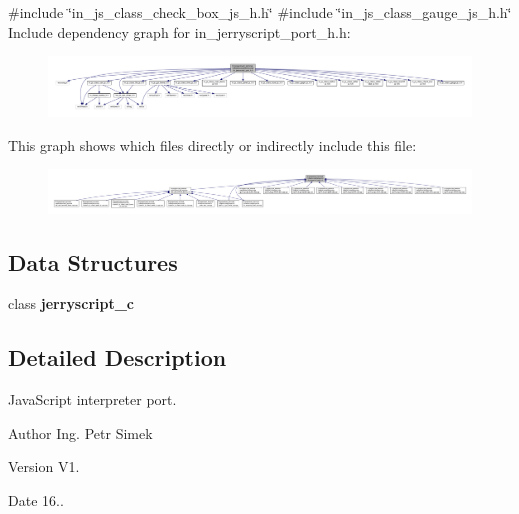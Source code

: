 {\ttfamily \#include \char`\"{}in\+\_\+js\+\_\+class\+\_\+check\+\_\+box\+\_\+js\+\_\+h.\+h\char`\"{}}\newline
{\ttfamily \#include \char`\"{}in\+\_\+js\+\_\+class\+\_\+gauge\+\_\+js\+\_\+h.\+h\char`\"{}}\newline
Include dependency graph for in\+\_\+jerryscript\+\_\+port\+\_\+h.\+h\+:\nopagebreak
\begin{figure}[H]
\begin{center}
\leavevmode
\includegraphics[width=350pt]{in__jerryscript__port__h_8h__incl}
\end{center}
\end{figure}
This graph shows which files directly or indirectly include this file\+:\nopagebreak
\begin{figure}[H]
\begin{center}
\leavevmode
\includegraphics[width=350pt]{in__jerryscript__port__h_8h__dep__incl}
\end{center}
\end{figure}
\subsection*{Data Structures}
\begin{DoxyCompactItemize}
\item 
class \textbf{ jerryscript\+\_\+c}
\end{DoxyCompactItemize}


\subsection{Detailed Description}
Java\+Script interpreter port. 

\begin{DoxyAuthor}{Author}
Ing. Petr Simek 
\end{DoxyAuthor}
\begin{DoxyVersion}{Version}
V1. 
\end{DoxyVersion}
\begin{DoxyDate}{Date}
16.. 
\end{DoxyDate}
